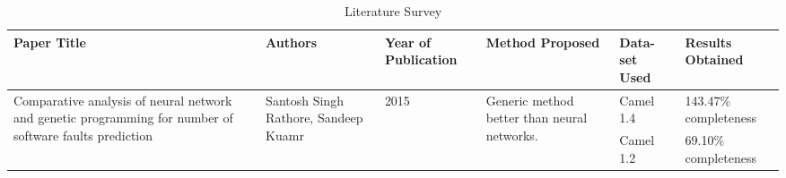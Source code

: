 \documentclass[10pt, conference, compsocconf]{IEEEtran}
\begin{document}
\begin{table*}[t]
  \centering
  \caption{Literature Survey}
  \label{tab:literature-survey}
  \begin{tabular}{|p{5cm}|p{3cm}|p{1cm}|p{3cm}|p{2cm}|p{2cm}|}
    \hline
    \textbf{Paper Title} & \textbf{Authors} & \textbf{Year of Publication} & \textbf{Method Proposed} & \textbf{Data-set Used} & \textbf{Results Obtained} \\ \hline
    \multirow{2}{5cm}{Comparative analysis of neural network and genetic programming for number of software faults prediction \cite{paper1}} &
    \multirow{2}{3cm}{Santosh Singh Rathore, Sandeep Kuamr} &
    \multirow{2}{1cm}{2015} &
    \multirow{2}{3cm}{Generic method better than neural networks.} &
    Camel 1.4 & 143.47\% completeness \\ \cline{5-6}
    & & & & Camel 1.2 & 69.10\% completeness \\ \hline


\end{tabular}
\end{table*}
\end{document}
